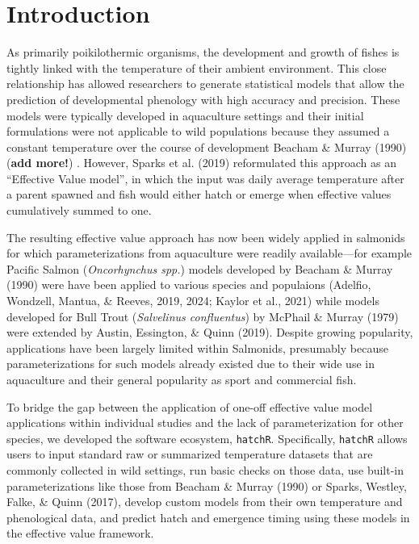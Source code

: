 \documentclass[10pt,a4paper,onecolumn]{article}
\begin{document}
\section{Introduction}\label{introduction}

As primarily poikilothermic organisms, the development and growth of
fishes is tightly linked with the temperature of their ambient
environment. This close relationship has allowed researchers to generate
statistical models that allow the prediction of developmental phenology
with high accuracy and precision. These models were typically developed
in aquaculture settings and their initial formulations were not
applicable to wild populations because they assumed a constant
temperature over the course of development Beacham \& Murray (1990)
(\textbf{add more!}) . However, Sparks et al. (2019) reformulated this
approach as an ``Effective Value model'', in which the input was daily
average temperature after a parent spawned and fish would either hatch
or emerge when effective values cumulatively summed to one.

The resulting effective value approach has now been widely applied in
salmonids for which parameterizations from aquaculture were readily
available---for example Pacific Salmon (\emph{Oncorhynchus spp.}) models
developed by Beacham \& Murray (1990) were have been applied to various
species and populaions (Adelfio, Wondzell, Mantua, \& Reeves, 2019,
2024; Kaylor et al., 2021) while models developed for Bull Trout
(\emph{Salvelinus confluentus}) by McPhail \& Murray (1979) were
extended by Austin, Essington, \& Quinn (2019). Despite growing
popularity, applications have been largely limited within Salmonids,
presumably because parameterizations for such models already existed due
to their wide use in aquaculture and their general popularity as sport
and commercial fish.

To bridge the gap between the application of one-off effective value
model applications within individual studies and the lack of
parameterization for other species, we developed the software ecosystem,
\texttt{hatchR}. Specifically, \texttt{hatchR} allows users to input
standard raw or summarized temperature datasets that are commonly
collected in wild settings, run basic checks on those data, use built-in
parameterizations like those from Beacham \& Murray (1990) or Sparks,
Westley, Falke, \& Quinn (2017), develop custom models from their own
temperature and phenological data, and predict hatch and emergence
timing using these models in the effective value framework.
\end{document}
